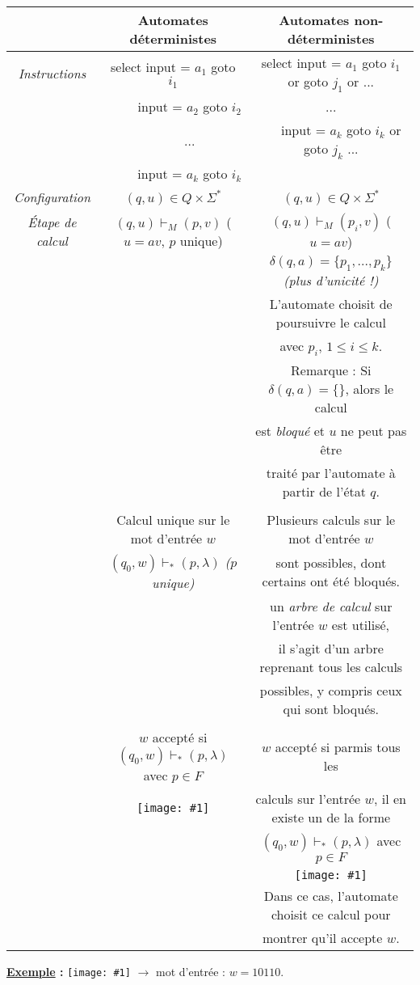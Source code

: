 \documentclass{article}
\newcommand{\term}[1]{\textit{\textcolor{maintitle}{#1}}}
\newcommand{\imageR}[2]{\texttt{[image: \#1]}}
\begin{document}
\begin{sffamily}
\begin{center}
\begin{tabular}{|c|cc|}
\hline
& \textbf{Automates déterministes} & \textbf{Automates non-déterministes} \\
\hline
\textit{Instructions} & select input = $a_1$ goto $i_1$ & select input = $a_1$ goto $i_1$ or goto $j_1$ or ... \\
& $\qquad\ $ input = $a_2$ goto $i_2$ & ... \\
& $\qquad\ $ ... & $\quad\ $ input = $a_k$ goto $i_k$ or goto $j_k$ ... \\
& $\qquad\ $ input = $a_k$ goto $i_k$ & \\
\hline
\textit{Configuration} & $(q,u) \in Q \times \Sigma^*$ & $(q,u) \in Q \times \Sigma^*$ \\
\hline
\textit{Étape de calcul} & $(q,u) \vdash_M (p,v)$ ($u = av$, $p$ unique) & $(q,u) \vdash_M (p_i,v)$ ($u = av$)\\
& & $\delta(q,a) = \{p_1,...,p_k\}$ \textit{(plus d'unicité !)} \\
& & L'automate choisit de poursuivre le calcul\\
& & avec $p_i$, $1\leq i\leq k$. \\
& & Remarque : Si $\delta(q,a) = \{\}$, alors le calcul \\
& & est \term{bloqué} et $u$ ne peut pas être \\
& & traité par l'automate à partir de l'état $q$. \\
& & \\
& Calcul unique sur le mot d'entrée $w$ & Plusieurs calculs sur le mot d'entrée $w$ \\
& $(q_0,w) \vdash_* (p,\lambda)$ \textit{($p$ unique)} & sont possibles, dont certains ont été bloqués.\\
& & un \term{arbre de calcul} sur l'entrée $w$ est utilisé, \\
& & il s'agit d'un arbre reprenant tous les calculs\\
& & possibles, y compris ceux qui sont bloqués. \\
& & \\
& $w$ accepté si $(q_0,w) \vdash_* (p,\lambda)$ avec $p\in F$ & $w$ accepté si parmis tous les \\
& \imageR{img14.png}{100} & calculs sur l'entrée $w$, il en existe un de la forme \\
& & $(q_0,w) \vdash_* (p,\lambda)$ avec $p\in F$ \\
& & \imageR{img15.png}{100} \\
& & Dans ce cas, l'automate choisit ce calcul pour\\
& & montrer qu'il accepte $w$. \\
\hline
\end{tabular}
\end{center}
\newpage
\textbf{\underline{Exemple} :} \imageR{img10.png}{200} $\rightarrow$ mot d'entrée : $w = 10110$. \\


\end{sffamily}
\end{document}
